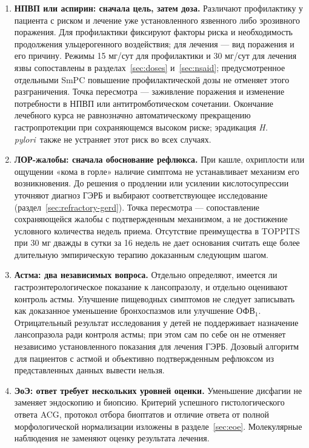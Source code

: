 \documentclass[11pt,a4paper,notitlepage]{report}
\newcommand{\Hp}{\textit{H. pylori}}
\newcommand{\src}[1]{\unskip\space\cite{#1}}
\begin{document}
\begin{enumerate}
\item \textbf{НПВП или аспирин: сначала цель, затем доза.} Различают профилактику у пациента с риском и лечение уже установленного язвенного либо эрозивного поражения. Для профилактики фиксируют факторы риска и необходимость продолжения ульцерогенного воздействия; для лечения --- вид поражения и его причину. Режимы 15 мг/сут для профилактики и 30 мг/сут для лечения язвы сопоставлены в разделах~\ref{sec:doses} и~\ref{sec:nsaid}; предусмотренное отдельными SmPC повышение профилактической дозы не отменяет этого разграничения. Точка пересмотра --- заживление поражения и изменение потребности в НПВП или антитромботическом сочетании. Окончание лечебного курса не равнозначно автоматическому прекращению гастропротекции при сохраняющемся высоком риске; эрадикация \Hp\ также не устраняет этот риск во всех случаях.\src{uslabel,hpra,nice,aspirintrial,agadepres}

\item \textbf{ЛОР-жалобы: сначала обоснование рефлюкса.} При кашле, охриплости или ощущении «кома в горле» наличие симптома не устанавливает механизм его возникновения. До решения о продлении или усилении кислотосупрессии уточняют диагноз ГЭРБ и выбирают соответствующее исследование (раздел~\ref{sec:refractory-gerd}). Точка пересмотра --- сопоставление сохраняющейся жалобы с подтвержденным механизмом, а не достижение условного количества недель приема. Отсутствие преимущества в TOPPITS при 30 мг дважды в сутки за 16 недель не дает основания считать еще более длительную эмпирическую терапию доказанным следующим шагом.\src{agagerd,dgvs,lyon,toppits}

\item \textbf{Астма: два независимых вопроса.} Отдельно определяют, имеется ли гастроэнтерологическое показание к лансопразолу, и отдельно оценивают контроль астмы. Улучшение пищеводных симптомов не следует записывать как доказанное уменьшение бронхоспазмов или улучшение ОФВ$_1$. Отрицательный результат исследования у детей не поддерживает назначение лансопразола ради контроля астмы; при этом сам по себе он не отменяет независимо установленного показания для лечения ГЭРБ. Дозовый алгоритм для пациентов с астмой и объективно подтвержденным рефлюксом из представленных данных вывести нельзя.\src{asthma}

\item \textbf{ЭоЭ: ответ требует нескольких уровней оценки.} Уменьшение дисфагии не заменяет эндоскопию и биопсию. Критерий успешного гистологического ответа ACG, протокол отбора биоптатов и отличие ответа от полной морфологической нормализации изложены в разделе~\ref{sec:eoe}. Молекулярные наблюдения не заменяют оценку результата лечения.\src{eoe,eoeguide}


\end{enumerate}
\end{document}
